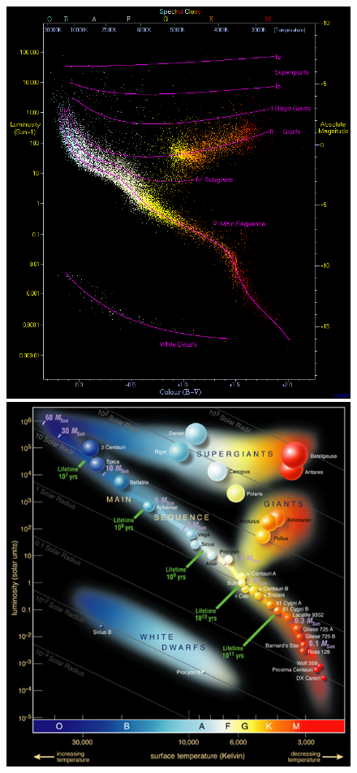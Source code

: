 \begin{figure}[H]
	\begin{minipage}{0.4 \textwidth}
		\hspace{1cm}
		\includegraphics[scale=0.22]{figures/Introduction/HRD2}	
	\end{minipage}
	\begin{minipage}{0.4 \textwidth}
		\hspace{1.5cm}
		\includegraphics[scale=0.3]{figures/Introduction/hrd}
	\end{minipage}
	

\end{figure}

